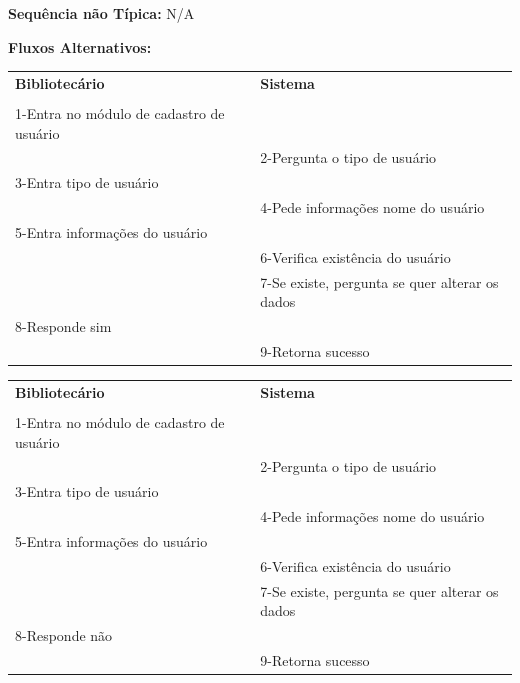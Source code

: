 \documentclass[
	12pt,				%
	openright,			%
	oneside,			%
	a4paper,			%
	english,			%
	brazil				%
	]{abntex2}
\begin{document}
\textbf{Sequência não Típica:} N/A

\textbf{Fluxos Alternativos:}

\begin{table}[H]
\ABNTEXfontereduzida
\begin{center}
\begin{tabular}{p{5.5cm} p{5.5cm}}
    \textbf{Bibliotecário} & \textbf{Sistema}\\
     & \\
    1-Entra no módulo de cadastro de usuário& \\
     & 2-Pergunta o tipo de usuário\\
    3-Entra tipo de usuário & \\
     & 4-Pede informações nome do usuário\\
    5-Entra informações do usuário & \\
     & 6-Verifica existência do usuário\\
     & 7-Se existe, pergunta se quer alterar os dados\\
     8-Responde sim & \\
     & 9-Retorna sucesso\\
\end{tabular}
\end{center}
\end{table} 

\begin{table}[H]
\ABNTEXfontereduzida
\begin{center}
\begin{tabular}{p{5.5cm} p{5.5cm}}
    \textbf{Bibliotecário} & \textbf{Sistema}\\
     & \\
    1-Entra no módulo de cadastro de usuário& \\
     & 2-Pergunta o tipo de usuário\\
    3-Entra tipo de usuário & \\
     & 4-Pede informações nome do usuário\\
    5-Entra informações do usuário & \\
     & 6-Verifica existência do usuário\\
     & 7-Se existe, pergunta se quer alterar os dados\\
    8-Responde não & \\
     & 9-Retorna sucesso\\
\end{tabular}
\end{center}
\end{table} 
\end{document}
